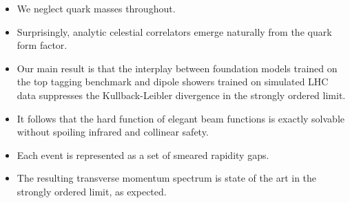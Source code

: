 \begin{itemize}
  \item We neglect quark masses throughout.
  \item Surprisingly, analytic celestial correlators emerge naturally from the quark form factor.
  \item Our main result is that the interplay between foundation models trained on the top tagging benchmark and dipole showers trained on simulated LHC data suppresses the Kullback-Leibler divergence in the strongly ordered limit.
\end{itemize}

\begin{itemize}
  \item It follows that the hard function of elegant beam functions is exactly solvable without spoiling infrared and collinear safety.
  \item Each event is represented as a set of smeared rapidity gaps.
  \item The resulting transverse momentum spectrum is state of the art in the strongly ordered limit, as expected.
\end{itemize}

